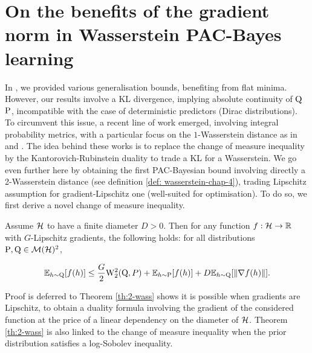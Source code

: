 \section{On the benefits of the gradient norm in Wasserstein PAC-Bayes learning}

In , we provided various generalisation bounds, benefiting from flat minima.
However, our results involve a KL divergence, implying absolute continuity of $\Q$ \wrt $\P$, incompatible with the case of deterministic predictors (Dirac distributions).
To circumvent this issue, a recent line of work emerged, involving integral probability metrics, with a particular focus on the $1$-Wasserstein distance as in  and \citet{amit2022integral}.
The idea behind these works is to replace the change of measure inequality  \citep{csizar1975divergence,donsker1976asymp} by the Kantorovich-Rubinstein duality \citep{villani2009optimal} to trade a KL for a Wasserstein.
We go even further here by obtaining the first PAC-Bayesian bound involving directly a 2-Wasserstein distance (see definition \ref{def: wasserstein-chap-4}), trading Lipschitz assumption for gradient-Lipschitz one (well-suited for optimisation). To do so, we first derive a novel change of measure inequality.

\begin{theorem}
  \label{th:2-wass}
  Assume $\Hcal$ to have a finite diameter $D>0$. Then for any function $f:\Hcal\rightarrow \Rbb$ with $G$-Lipschitz gradients, the following holds: for all distributions $\P,\Q\in\Mcal(\Hcal)^2$, 

  \[ \mathbb{E}_{h\sim \Q}[f(h)] \leq \frac{G}{2}\W_2^2(\Q,P) + \mathbb{E}_{h\sim \P}[f(h)] +D \mathbb{E}_{h\sim\Q}[\|\nabla f (h)\|].  \]
\end{theorem}
Proof is deferred to 
Theorem \ref{th:2-wass} shows it is possible when gradients are Lipschitz, to obtain a duality formula involving the gradient of the considered function at the price of a linear dependency on the diameter of $\Hcal$.
Theorem \ref{th:2-wass} is also linked to the change of measure inequality when the prior distribution satisfies a log-Sobolev inequality. 

